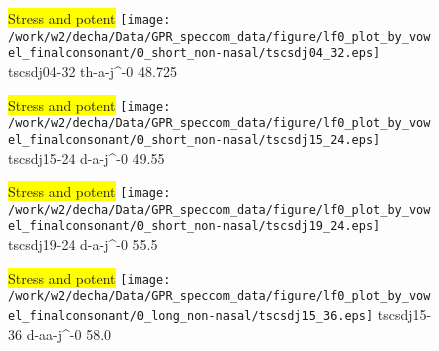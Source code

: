 \documentclass{article}
\begin{document}
\begin{figure}[t]
\begin{minipage}[b]{.24\textwidth}
\colorbox{yellow}{Stress and potent}
\centering
\texttt{[image: /work/w2/decha/Data/GPR\_speccom\_data/figure/lf0\_plot\_by\_vowel\_finalconsonant/0\_short\_non-nasal/tscsdj04\_32.eps]}
tscsdj04-32 th-a-j\textasciicircum-0 48.725
\end{minipage}
\begin{minipage}[b]{.24\textwidth}
\colorbox{yellow}{Stress and potent}
\centering
\texttt{[image: /work/w2/decha/Data/GPR\_speccom\_data/figure/lf0\_plot\_by\_vowel\_finalconsonant/0\_short\_non-nasal/tscsdj15\_24.eps]}
tscsdj15-24 d-a-j\textasciicircum-0 49.55
\end{minipage}
\begin{minipage}[b]{.24\textwidth}
\colorbox{yellow}{Stress and potent}
\centering
\texttt{[image: /work/w2/decha/Data/GPR\_speccom\_data/figure/lf0\_plot\_by\_vowel\_finalconsonant/0\_short\_non-nasal/tscsdj19\_24.eps]}
tscsdj19-24 d-a-j\textasciicircum-0 55.5
\end{minipage}
\begin{minipage}[b]{.24\textwidth}
\colorbox{yellow}{Stress and potent}
\centering
\texttt{[image: /work/w2/decha/Data/GPR\_speccom\_data/figure/lf0\_plot\_by\_vowel\_finalconsonant/0\_long\_non-nasal/tscsdj15\_36.eps]}
tscsdj15-36 d-aa-j\textasciicircum-0 58.0
\end{minipage}
\end{figure}
\end{document}

